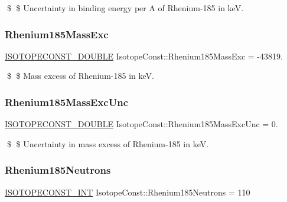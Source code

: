 \$ \$ Uncertainty in binding energy per A of Rhenium-\/185 in keV. \mbox{\label{group___isotope_const-_rhenium-_re185_gaad7c581fd93545c4f9b63da0a7641889}} 
\subsubsection{\texorpdfstring{Rhenium185\+Mass\+Exc}{Rhenium185MassExc}}
{\footnotesize\ttfamily \mbox{\hyperlink{group___isotope_const-_macros_ga8f45a7272ce02c0b4c65c44636ed719a}{I\+S\+O\+T\+O\+P\+E\+C\+O\+N\+S\+T\+\_\+\+D\+O\+U\+B\+LE}} Isotope\+Const\+::\+Rhenium185\+Mass\+Exc = -\/43819.}

\$ \$ Mass excess of Rhenium-\/185 in keV. \mbox{\label{group___isotope_const-_rhenium-_re185_ga8fcedb5562dcfe7b55443e3632344c58}} 
\subsubsection{\texorpdfstring{Rhenium185\+Mass\+Exc\+Unc}{Rhenium185MassExcUnc}}
{\footnotesize\ttfamily \mbox{\hyperlink{group___isotope_const-_macros_ga8f45a7272ce02c0b4c65c44636ed719a}{I\+S\+O\+T\+O\+P\+E\+C\+O\+N\+S\+T\+\_\+\+D\+O\+U\+B\+LE}} Isotope\+Const\+::\+Rhenium185\+Mass\+Exc\+Unc = 0.}

\$ \$ Uncertainty in mass excess of Rhenium-\/185 in keV. \mbox{\label{group___isotope_const-_rhenium-_re185_gae2d7fd09588fd30f61a3a300255e1851}} 
\subsubsection{\texorpdfstring{Rhenium185\+Neutrons}{Rhenium185Neutrons}}
{\footnotesize\ttfamily \mbox{\hyperlink{group___isotope_const-_macros_ga5f18360b3e99483a35c32d789e62621c}{I\+S\+O\+T\+O\+P\+E\+C\+O\+N\+S\+T\+\_\+\+I\+NT}} Isotope\+Const\+::\+Rhenium185\+Neutrons = 110}

